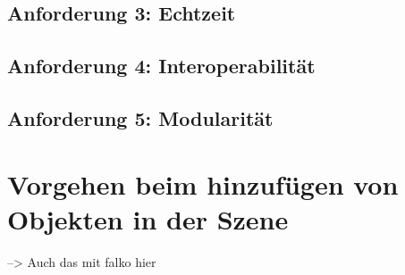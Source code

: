 \subsection{Anforderung 3: Echtzeit}

\subsection{Anforderung 4: Interoperabilität}

\subsection{Anforderung 5: Modularität}

\section{Vorgehen beim hinzufügen von Objekten in der Szene}\label{sec:ValidVorgehen}
--> Auch das mit falko hier
